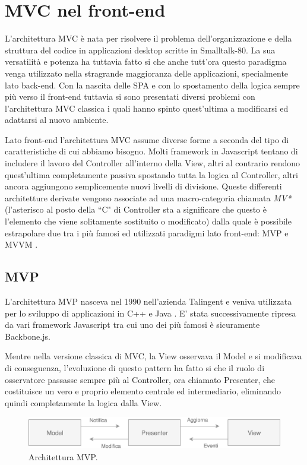 \section{MVC nel front-end}
L'architettura MVC è nata per risolvere il problema dell'organizzazione e della struttura del codice in applicazioni desktop scritte in Smalltalk-80. La sua versatilità e potenza ha tuttavia fatto si che anche tutt'ora questo paradigma venga utilizzato nella stragrande maggioranza delle applicazioni, specialmente lato back-end.
Con la nascita delle SPA e con lo spostamento della logica sempre più verso il front-end tuttavia si sono presentati diversi problemi con l'architettura MVC classica i quali hanno spinto quest'ultima a modificarsi ed adattarsi al nuovo ambiente.

Lato front-end l'architettura MVC assume diverse forme a seconda del tipo di caratteristiche di cui abbiamo bisogno. Molti framework in Javascript tentano di includere il lavoro del Controller all'interno della View, altri al contrario rendono quest'ultima completamente passiva spostando tutta la logica al Controller, altri ancora aggiungono semplicemente nuovi livelli di divisione. Queste differenti architetture derivate vengono associate ad una macro-categoria chiamata \textit{MV*} (l'asterisco al posto della “C" di Controller sta a significare che questo è l'elemento che viene solitamente sostituito o modificato) dalla quale è possibile estrapolare due tra i più famosi ed utilizzati paradigmi lato front-end: MVP e MVVM \cite{OsmaniOnJSFrameworks}.

\subsection{MVP}
\label{ThesisMVPSection}
L'architettura MVP nasceva nel 1990 nell'azienda Talingent e veniva utilizzata per lo sviluppo di applicazioni in C++ e Java \cite{Potel1996mvp}. E' stata successivamente ripresa da vari framework Javascript tra cui uno dei più famosi è sicuramente Backbone.js.

\noindent
Mentre nella versione classica di MVC, la View osservava il Model e si modificava di conseguenza, l'evoluzione di questo pattern ha fatto si che il ruolo di osservatore passasse sempre più al Controller, ora chiamato Presenter, che costituisce un vero e proprio elemento centrale ed intermediario, eliminando quindi completamente la logica dalla View.

\begin{figure}[h]
\centering 
\vspace*{0.5cm}
\includegraphics[width=13cm]{./images/MVPworkflow}
\caption{Architettura MVP.}
\label{MVPworkflow}
\vspace*{0.5cm} 
\end{figure}

